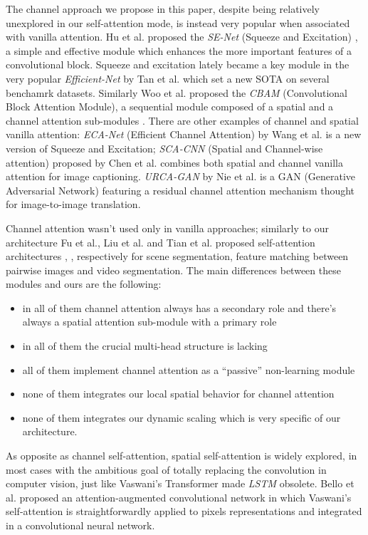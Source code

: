 \documentclass[fleqn,10pt]{SelfArx}
\begin{document}
The channel approach we propose in this paper, despite being relatively unexplored in our self-attention mode, is instead very popular when associated with vanilla attention. Hu et al. proposed the \textit{SE-Net} (Squeeze and Excitation) \cite{hu2018squeeze}, a simple and effective module which enhances the more important features of a convolutional block. Squeeze and excitation lately became a key module in the very popular \textit{Efficient-Net} by Tan et al. \cite{tan2019efficientnet}  which set a new SOTA on several benchamrk datasets. 
Similarly Woo et al. proposed the \textit{CBAM} (Convolutional Block Attention Module), a sequential module composed of a spatial and a channel attention sub-modules \cite{woo2018cbam}.
There are other examples of channel and spatial vanilla attention: \textit{ECA-Net} (Efficient Channel Attention) by Wang et al. \cite{wang2020ecanet} is a new version of Squeeze and Excitation; \textit{SCA-CNN} (Spatial and Channel-wise attention) proposed by Chen et al. \cite{chen2017sca} combines both spatial and channel vanilla attention for image captioning. \textit{URCA-GAN} by Nie et al. \cite{nie2021urca} is a GAN (Generative Adversarial Network) featuring a residual channel attention mechanism thought for image-to-image translation.

Channel attention wasn't used only in vanilla approaches; similarly to our architecture Fu et al., Liu et al. and Tian et al. proposed self-attention architectures \cite{fu2019dual}, \cite{liu2021scsa}, \cite{tian2020triple} respectively for scene segmentation, feature matching between pairwise images and video segmentation. The main differences between these modules and ours are the following:

\begin{itemize}
  \item in all of them channel attention always has a secondary role and there's always a spatial attention sub-module with a primary role
  \item in all of them the crucial multi-head structure is lacking
  \item all of them implement channel attention as a ``passive'' non-learning module
  \item none of them integrates our local spatial behavior for channel attention
  \item none of them integrates our dynamic scaling which is very specific of our architecture.
\end{itemize}

As opposite as channel self-attention, spatial self-attention is widely explored, in most cases with the ambitious goal of totally replacing the convolution in computer vision, just like Vaswani's Transformer made \textit{LSTM} obsolete. 
Bello et al. proposed an attention-augmented convolutional network \cite{bello2019attention} in which Vaswani's self-attention is straightforwardly applied to pixels representations and integrated in a convolutional neural network.
\end{document}
